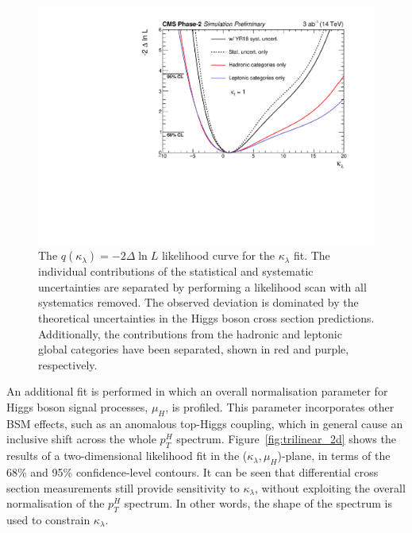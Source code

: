 \begin{figure}
  \centering
  \includegraphics[width=.7\textwidth]{Figures/cms/trilinear/CMS-PAS-FTR-18-020_Figure_007.pdf}
  \caption[Likelihood curve for the $\kappa_\lambda$ fit]
  {
    The $q(\kappa_\lambda)=-2\Delta \ln L$ likelihood curve for the $\kappa_\lambda$ fit. The individual contributions of the statistical and systematic uncertainties are separated by performing a likelihood scan with all systematics removed. The observed deviation is dominated by the theoretical uncertainties in the Higgs boson cross section predictions. Additionally, the contributions from the hadronic and leptonic global categories have been separated, shown in red and purple, respectively.
  }
  \label{fig:trilinear_likelihood}
\end{figure}

An additional fit is performed in which an overall normalisation parameter for Higgs boson signal processes, $\mu_H$, is profiled. This parameter incorporates other BSM effects, such as an anomalous top-Higgs coupling, which in general cause an inclusive shift across the whole $p_T^H$ spectrum. Figure~\ref{fig:trilinear_2d} shows the results of a two-dimensional likelihood fit in the ($\kappa_\lambda,\mu_H$)-plane, in terms of the 68\% and 95\% confidence-level contours. It can be seen that differential cross section measurements still provide sensitivity to $\kappa_\lambda$, without exploiting the overall normalisation of the $p_T^H$ spectrum. In other words, the shape of the spectrum is used to constrain $\kappa_\lambda$.

